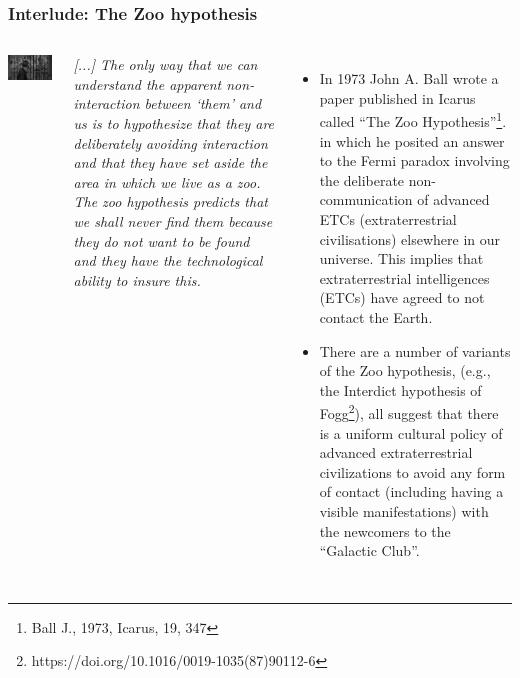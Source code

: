 \begin{frame}
\frametitle{Interlude: The Zoo hypothesis}

\begin{columns}
\includegraphics[scale=0.25]{zoo}
 
 {\em [...] The only way that we can understand the apparent non-interaction between ‘them’ and us is to hypothesize that they are deliberately avoiding interaction and that they have set aside the area in which we live as a zoo. The zoo hypothesis predicts that we shall never find them because they do not want to be found and they have the technological ability to insure this. }

 \begin{itemize}
 \item
 In 1973 John A. Ball wrote a paper published in Icarus called ``The Zoo Hypothesis''\footnote{Ball J., 1973, Icarus, 19, 347}. in which he posited an answer to the Fermi paradox involving the deliberate non-communication of advanced ETCs (extraterrestrial civilisations) elsewhere in our universe. This implies that extraterrestrial intelligences (ETCs) have agreed to not contact the Earth. 
 \item There are a number of variants of the Zoo hypothesis, (e.g., the {Interdict hypothesis} of Fogg\footnote{https://doi.org/10.1016/0019-1035(87)90112-6}), all suggest that there is a uniform cultural policy of advanced extraterrestrial civilizations to avoid any form of contact (including having a visible manifestations) with the newcomers to the ``Galactic Club''.
 \end{itemize}
 \end{columns}
\end{frame}

